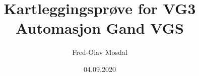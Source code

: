 \title {Kartleggingsprøve for VG3 Automasjon Gand VGS} 
\author {Fred-Olav Mosdal}
\date {04.09.2020}
\maketitle
